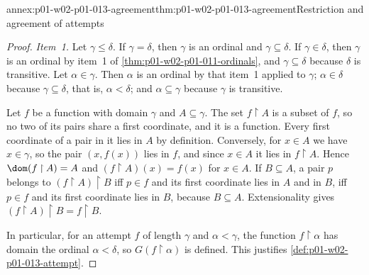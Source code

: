 \begin{annexitem}{annex:p01-w02-p01-013-agreement}{thm:p01-w02-p01-013-agreement}{Restriction and agreement of attempts}
\begin{proof}
\emph{Item~1.} Let \(\gamma\leq\delta\). If \(\gamma=\delta\), then
\(\gamma\) is an ordinal and \(\gamma\subseteq\delta\). If
\(\gamma\in\delta\), then \(\gamma\) is an ordinal by item~1 of
\cref{thm:p01-w02-p01-011-ordinals}, and \(\gamma\subseteq\delta\) because
\(\delta\) is transitive. Let \(\alpha\in\gamma\). Then \(\alpha\) is an
ordinal by that item~1 applied to \(\gamma\); \(\alpha\in\delta\) because
\(\gamma\subseteq\delta\), that is, \(\alpha<\delta\); and
\(\alpha\subseteq\gamma\) because \(\gamma\) is transitive.

Let \(f\) be a function with domain \(\gamma\) and \(A\subseteq\gamma\). The
set \(f\mathbin{\upharpoonright}A\) is a subset of \(f\), so no two of its
pairs share a first coordinate, and it is a function. Every first coordinate
of a pair in it lies in \(A\) by definition. Conversely, for \(x\in A\) we
have \(x\in\gamma\), so the pair \((x,f(x))\) lies in \(f\), and since
\(x\in A\) it lies in \(f\mathbin{\upharpoonright}A\). Hence
\(\dom(f\mathbin{\upharpoonright}A)=A\) and
\((f\mathbin{\upharpoonright}A)(x)=f(x)\) for \(x\in A\). If
\(B\subseteq A\), a pair \(p\) belongs to
\((f\mathbin{\upharpoonright}A)\mathbin{\upharpoonright}B\) iff \(p\in f\)
and its first coordinate lies in \(A\) and in \(B\), iff \(p\in f\) and its
first coordinate lies in \(B\), because \(B\subseteq A\). Extensionality gives
\((f\mathbin{\upharpoonright}A)\mathbin{\upharpoonright}B
=f\mathbin{\upharpoonright}B\).

In particular, for an attempt \(f\) of length \(\gamma\) and
\(\alpha<\gamma\), the function \(f\mathbin{\upharpoonright}\alpha\) has
domain the ordinal \(\alpha<\delta\), so \(G(f\mathbin{\upharpoonright}\alpha)\)
is defined. This justifies \cref{def:p01-w02-p01-013-attempt}.


\end{proof}
\end{annexitem}
